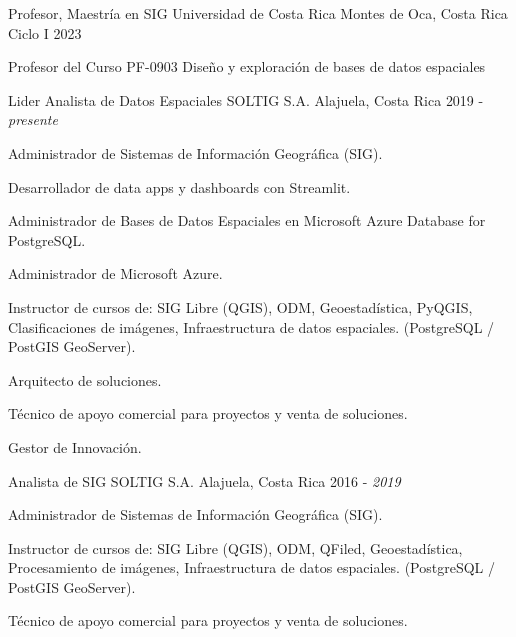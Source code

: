 

\begin{cventries}

  \cventry
    {Profesor, Maestría en SIG} %
    {Universidad de Costa Rica} %
    {Montes de Oca, Costa Rica} %
    {Ciclo I 2023} %
    {
      \begin{cvitems} %
        \item Profesor del Curso PF-0903 Diseño y exploración de bases de datos
        espaciales
      \end{cvitems}
    }
  \cventry
    {Lider Analista de Datos Espaciales} %
    {SOLTIG S.A.} %
    {Alajuela, Costa Rica} %
    {2019 - \textit{presente}} %
    {
      \begin{cvitems} %
        \item Administrador de Sistemas de Información Geográfica (SIG).
        \item Desarrollador de data apps y dashboards con Streamlit.
        \item Administrador de Bases de Datos Espaciales en Microsoft Azure
        Database for PostgreSQL.
        \item Administrador de Microsoft Azure.
        \item Instructor de cursos de: SIG Libre (QGIS), ODM, Geoestadística, PyQGIS,
        Clasificaciones de imágenes, Infraestructura de datos espaciales.
        (PostgreSQL / PostGIS GeoServer).
        \item Arquitecto de soluciones.
        \item Técnico de apoyo comercial para proyectos y venta de
        soluciones.
        \item Gestor de Innovación.
      \end{cvitems}
    }
  \cventry
    {Analista de SIG} %
    {SOLTIG S.A.} %
    {Alajuela, Costa Rica} %
    {2016 - \textit{2019}} %
    {
      \begin{cvitems} %
        \item Administrador de Sistemas de Información Geográfica (SIG).
        \item Instructor de cursos de: SIG Libre (QGIS), ODM, QFiled, Geoestadística,
        Procesamiento de imágenes, Infraestructura de datos espaciales.
        (PostgreSQL / PostGIS GeoServer).
        \item Técnico de apoyo comercial para proyectos y venta de
        soluciones.
      \end{cvitems}
    }
\end{cventries}
\newpage